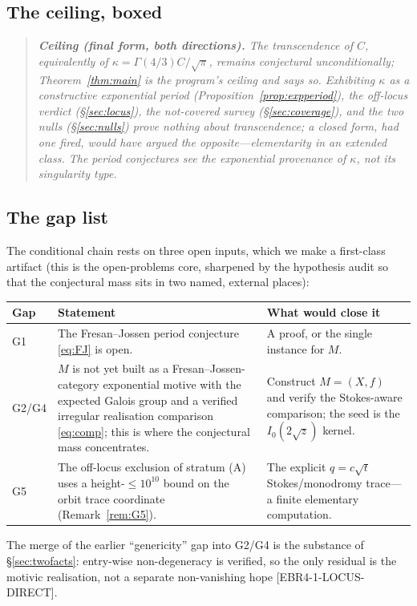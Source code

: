 \documentclass[11pt,reqno]{amsart}
\theoremstyle{plain}
\theoremstyle{definition}
\theoremstyle{remark}
\newcommand{\claim}[1]{\textsf{\small[#1]}}
\begin{document}
\subsection{The ceiling, boxed}\label{sec:ceilingbox}
\begin{quote}\small\itshape
\textbf{Ceiling (final form, both directions).} The transcendence of $C$,
equivalently of $\kappa=\Gamma(4/3)C/\sqrt\pi$, remains conjectural
unconditionally; Theorem~\ref{thm:main} is the program's ceiling and says so.
Exhibiting $\kappa$ as a constructive exponential period
(Proposition~\ref{prop:expperiod}), the off-locus verdict (\S\ref{sec:locus}),
the not-covered survey (\S\ref{sec:coverage}), and the two nulls
(\S\ref{sec:nulls}) prove nothing about transcendence; a closed form, had one
fired, would have argued the opposite---elementarity in an extended class. The
period conjectures see the exponential provenance of $\kappa$, not its
singularity type.
\end{quote}

\subsection{The gap list}\label{sec:gaps}
The conditional chain rests on three open inputs, which we make a first-class
artifact (this is the open-problems core, sharpened by the hypothesis audit so
that the conjectural mass sits in two named, external places):
\begin{center}
\small
\begin{tabular}{@{}l>{\raggedright\arraybackslash}p{}>{\raggedright\arraybackslash}p{}@{}}
\toprule
Gap & Statement & What would close it \\
\midrule
G1 & The Fresan--Jossen period conjecture \eqref{eq:FJ} is open. & A proof, or
the single instance for $M$. \\
G2/G4 & $M$ is not yet built as a Fresan--Jossen-category exponential motive
with the expected Galois group and a verified irregular realisation comparison
\eqref{eq:comp}; this is where the conjectural mass concentrates. & Construct
$M=(X,f)$ and verify the Stokes-aware comparison; the seed is the
$I_{0}(2\sqrt z)$ kernel. \\
G5 & The off-locus exclusion of stratum (A) uses a height-$\le10^{10}$ bound on
the orbit trace coordinate (Remark~\ref{rem:G5}). & The explicit $q=c\sqrt{t}$
Stokes/monodromy trace---a finite elementary computation. \\
\bottomrule
\end{tabular}
\end{center}
The merge of the earlier ``genericity'' gap into G2/G4 is the substance of
\S\ref{sec:twofacts}: entry-wise non-degeneracy is verified, so the only
residual is the motivic realisation, not a separate non-vanishing hope
\claim{EBR4-1-LOCUS-DIRECT}.
\end{document}
